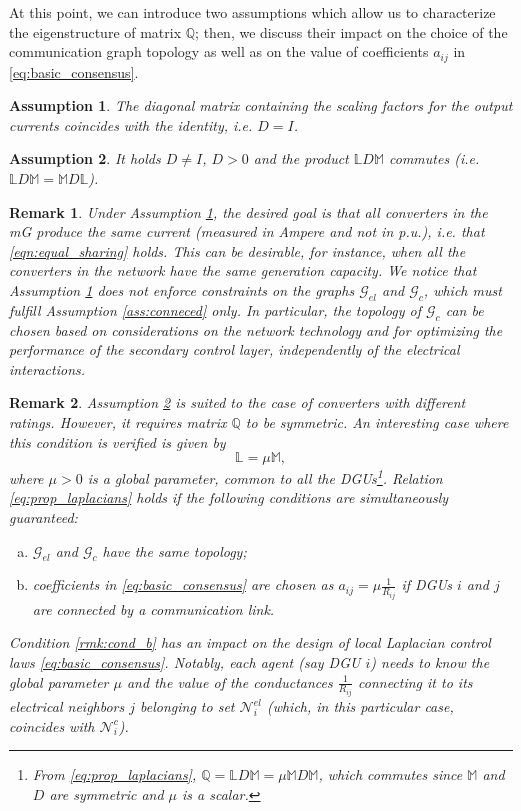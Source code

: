 \documentclass[a4paper]{article}
\theoremstyle{plain}
\newtheorem{ass}{Assumption}
\newtheorem{rmk}{Remark}
\begin{document}
	At this point, we can introduce two assumptions which allow us to characterize the eigenstructure of matrix $\mathbb{Q}$; then, we discuss their impact on the choice of the communication graph topology as well as on the value of coefficients $a_{ij}$ in \eqref{eq:basic_consensus}.
	\begin{ass}
		\label{ass:D_identity}
		The diagonal matrix containing the scaling factors for the output currents coincides with the identity, i.e. $D=I$.  
	\end{ass}
	\begin{ass}
		\label{ass:same_topology}
It holds $D\neq I$, $D > 0$ and the product $\mathbb{L}D\mathbb{M}$ commutes (i.e. $\mathbb{L}D\mathbb{M} =  \mathbb{M}D\mathbb{L}$).
	\end{ass}
	\begin{rmk}
		Under Assumption \ref{ass:D_identity}, the desired goal is that all converters in the mG produce the same current (measured in Ampere and not in p.u.), i.e. that \eqref{eqn:equal_sharing} holds. This can be desirable, for instance, when all the converters in the network have the same generation capacity. We notice that Assumption \ref{ass:D_identity} does not enforce constraints on the graphs $\mathcal{G}_{el}$ and $\mathcal{G}_{c}$, which must fulfill Assumption \ref{ass:conneced} only. In particular, the topology of $\mathcal{G}_{c}$ can be chosen based on considerations on the network technology and for optimizing the performance of the secondary control layer, independently of the electrical interactions.
	\end{rmk}
	\begin{rmk}
		\label{rmk:same_topology}
		Assumption \ref{ass:same_topology} is suited to the case of converters with different ratings. However, it requires matrix $\mathbb{Q}$ to be symmetric. An interesting case where this condition is verified is given by 
		\begin{equation}
		\label{eq:prop_laplacians}
		\mathbb{L} =  \mu\mathbb{M},
		\end{equation}
		where $\mu>0$ is a global parameter, common to all the DGUs\footnote{From \eqref{eq:prop_laplacians}, $\mathbb{Q} = \mathbb{L}D\mathbb{M} = \mu\mathbb{M}D\mathbb{M}$, which commutes since $\mathbb{M}$ and $D$ are symmetric and $\mu$ is a scalar.}. Relation \eqref{eq:prop_laplacians} holds if the following conditions are simultaneously guaranteed:
		\begin{enumerate}[(a)]
			\item $\mathcal{G}_{el}$ and $\mathcal{G}_{c}$ have the same topology;
			\item \label{rmk:cond_b}coefficients in \eqref{eq:basic_consensus} are chosen as $a_{ij} = \mu\frac{1}{R_{ij}}$ if DGUs $i$ and $j$ are connected by a communication link.
		\end{enumerate} 
		Condition \eqref{rmk:cond_b} has an impact on the design of local Laplacian control laws \eqref{eq:basic_consensus}. Notably, each agent (say DGU $i$) needs to know the global parameter $\mu$ and the value of the conductances $\frac{1}{R_{ij}}$ connecting it to its electrical neighbors $j$ belonging to set $\mathcal{N}^{el}_i$ (which, in this particular case, coincides with $\mathcal{N}^{c}_i$).
	\end{rmk}
\end{document}
